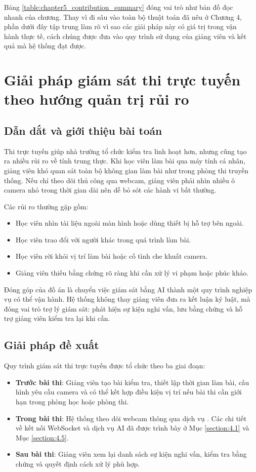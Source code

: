 \documentclass[../DoAn.tex]{subfiles}
\begin{document}
Bảng \ref{table:chapter5_contribution_summary} đóng vai trò như bản đồ đọc nhanh của chương. Thay vì đi sâu vào toàn bộ thuật toán đã nêu ở Chương 4, phần dưới đây tập trung làm rõ vì sao các giải pháp này có giá trị trong vận hành thực tế, cách chúng được đưa vào quy trình sử dụng của giảng viên và kết quả mà hệ thống đạt được.

\section{Giải pháp giám sát thi trực tuyến theo hướng quản trị rủi ro}
\label{section:5.1}

\subsection{Dẫn dắt và giới thiệu bài toán}
Thi trực tuyến giúp nhà trường tổ chức kiểm tra linh hoạt hơn, nhưng cũng tạo ra nhiều rủi ro về tính trung thực. Khi học viên làm bài qua máy tính cá nhân, giảng viên khó quan sát toàn bộ không gian làm bài như trong phòng thi truyền thống. Nếu chỉ theo dõi thủ công qua webcam, giảng viên phải nhìn nhiều ô camera nhỏ trong thời gian dài nên dễ bỏ sót các hành vi bất thường.

Các rủi ro thường gặp gồm:
\begin{itemize}
    \item Học viên nhìn tài liệu ngoài màn hình hoặc dùng thiết bị hỗ trợ bên ngoài.
    \item Học viên trao đổi với người khác trong quá trình làm bài.
    \item Học viên rời khỏi vị trí làm bài hoặc cố tình che khuất camera.
    \item Giảng viên thiếu bằng chứng rõ ràng khi cần xử lý vi phạm hoặc phúc khảo.
\end{itemize}

Đóng góp của đồ án là chuyển việc giám sát bằng AI thành một quy trình nghiệp vụ có thể vận hành. Hệ thống không thay giảng viên đưa ra kết luận kỷ luật, mà đóng vai trò trợ lý giám sát: phát hiện sự kiện nghi vấn, lưu bằng chứng và hỗ trợ giảng viên kiểm tra lại khi cần.

\subsection{Giải pháp đề xuất}
Quy trình giám sát thi trực tuyến được tổ chức theo ba giai đoạn:
\begin{itemize}
    \item \textbf{Trước bài thi}: Giảng viên tạo bài kiểm tra, thiết lập thời gian làm bài, cấu hình yêu cầu camera và có thể kết hợp điều kiện vị trí nếu bài thi cần giới hạn trong phòng học hoặc phòng thi.
    \item \textbf{Trong bài thi}: Hệ thống theo dõi webcam thông qua dịch vụ . Các chi tiết về kết nối WebSocket và dịch vụ AI đã được trình bày ở Mục \ref{section:4.1} và Mục \ref{section:4.5}.
    \item \textbf{Sau bài thi}: Giảng viên xem lại danh sách sự kiện nghi vấn, kiểm tra bằng chứng và quyết định cách xử lý phù hợp.
\end{itemize}
\end{document}
